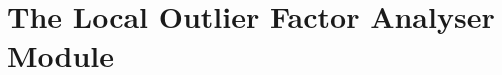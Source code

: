 \section{The Local Outlier Factor Analyser Module}
\label{sec:impl:lof}

\begin{comment}
\begin{itemize}
	\item purpose is to detect uncommon bus activity
	\item world view as well as agent based
	\item uses the \gls{lof} implementation of Scikit-learn \parencite{Pedregosa2011}
	

\end{comment}
